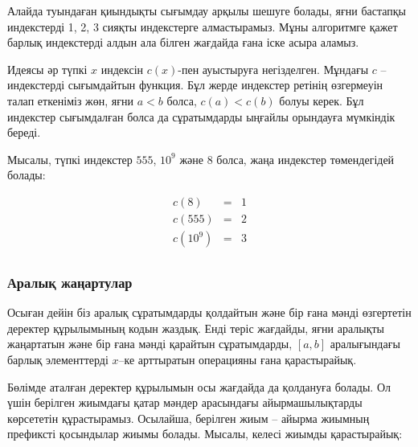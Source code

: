 
Алайда туындаған қиындықты сығымдау
арқылы шешуге болады, яғни бастапқы индекстерді
1, 2, 3 сияқты индекстерге алмастырамыз.
Мұны алгоритмге қажет барлық индекстерді
алдын ала білген жағдайда ғана іске асыра аламыз.

Идеясы әр түпкі $x$ индексін $c(x)$-пен ауыстыруға негізделген. 
Мұндағы $c$ -- индекстерді сығымдайтын функция. Бұл жерде 
индекстер ретінің өзгермеуін талап еткеніміз жөн, 
яғни $a<b$ болса, $c(a)<c(b)$ болуы керек.
Бұл индекстер сығымдалған болса да сұратымдарды
ыңғайлы орындауға мүмкіндік береді. 

Мысалы, түпкі индекстер $555$, $10^9$ және 
$8$ болса, жаңа индекстер төмендегідей болады:

\[
\begin{array}{lcl}
c(8) & = & 1 \\
c(555) & = & 2 \\
c(10^9) & = & 3 \\
\end{array}
\]

\subsubsection{Аралық жаңартулар}

Осыған дейін біз аралық сұратымдарды 
қолдайтын және бір ғана мәнді өзгертетін
деректер құрылымының кодын жаздық. 
Енді теріс жағдайды, яғни
аралықты жаңартатын және бір ғана мәнді 
қарайтын сұратымдарды, $[a,b]$ аралығындағы
барлық элементтерді
$x$–ке арттыратын операцияны ғана қарастырайық.


Бөлімде аталған деректер құрылымын 
осы жағдайда да қолдануға болады. 
Ол үшін берілген жиымдағы
қатар мәндер арасындағы айырмашылықтарды 
көрсететін  құрастырамыз.
Осылайша, берілген жиым -- айырма жиымның префиксті
қосындылар жиымы болады. 
Мысалы, келесі жиымды қарастырайық:

\begin{center}
\end{center}

